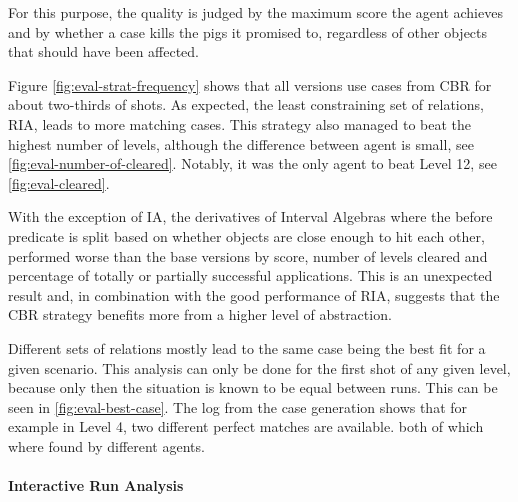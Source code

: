For this purpose, the quality is judged by the maximum score the agent achieves and by whether a case kills the pigs it promised to, regardless of other objects that should have been affected.

Figure \ref{fig:eval-strat-frequency} shows that all versions use cases from \ac{CBR} for about two-thirds of shots. As expected, the least constraining set of relations, \ac{RIA}, leads to more matching cases. This strategy also managed to beat the highest number of levels, although the difference between agent is small, see \ref{fig:eval-number-of-cleared}. Notably, it was the only agent to beat Level 12, see \ref{fig:eval-cleared}.

With the exception of \ac{IA}, the derivatives of Interval Algebras where the before predicate is split based on whether objects are close enough to hit each other, performed worse than the base versions by score, number of levels cleared and percentage of totally or partially successful applications. This is an unexpected result and, in combination with the good performance of \ac{RIA}, suggests that the \ac{CBR} strategy benefits more from a higher level of abstraction.

Different sets of relations mostly lead to the same case being the best fit for a given scenario. This analysis can only be done for the first shot of any given level, because only then the situation is known to be equal between runs. This can be seen in \ref{fig:eval-best-case}. The log from the case generation shows that for example in Level 4, two different perfect matches are available. both of which where found by different agents.

\paragraph{Interactive Run Analysis}

